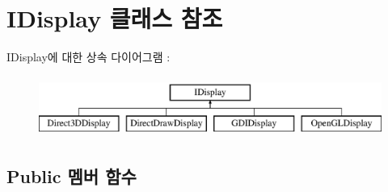 \hypertarget{class_i_display}{}\section{I\+Display 클래스 참조}
\label{class_i_display}
I\+Display에 대한 상속 다이어그램 \+: \begin{figure}[H]
\begin{center}
\leavevmode
\includegraphics[height=2.000000cm]{class_i_display}
\end{center}
\end{figure}
\subsection*{Public 멤버 함수}

